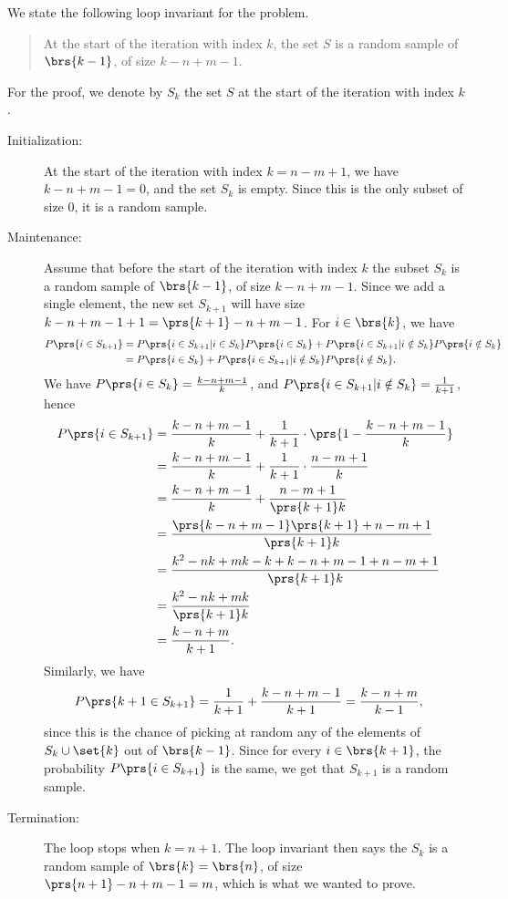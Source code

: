 \documentclass[oneside]{scrbook}
\theoremstyle{definition}
\begin{document}
\begin{exercise}
We state the following loop invariant for the problem.

\begin{quote}
At the start of the iteration with index $k$, the set $S$ is a random sample of $\brs{k-1}$, of size $k - n + m -1$.
\end{quote}

For the proof, we denote by $S_k$ the set $S$ at the start of the iteration with index $k$.

\begin{description}
\item[Initialization:]
At the start of the iteration with index $k = n -m + 1$, we have $k - n + m - 1 = 0$, and the set $S_k$ is empty. Since this is the only subset of size $0$, it is a random sample.
\item[Maintenance:]
Assume that before the start of the iteration with index $k$ the subset $S_k$ is a random sample of $\brs{k-1}$, of size $k - n + m - 1$. Since we add a single element, the new set $S_{k+1}$ will have size $k - n + m - 1 + 1 = \prs{k+1} - n + m -1$. For $i \in \brs{k}$, we have
\begin{align*}
P\prs{i \in S_{k+1}} &= P\prs{i \in S_{k+1} | i \in S_k} P\prs{i \in S_k} + P\prs{i \in S_{k+1} | i \notin S_k} P\prs{i \notin S_k}
\\&= P \prs{i \in S_k} + P\prs{i \in S_{k+1} | i \notin S_k} P\prs{i \notin S_k} \text{.}
\end{align*}
We have $P\prs{i \in S_k} = \frac{k-n+m-1}{k}$, and $P\prs{i \in S_{k+1} | i \notin S_k} = \frac{1}{k+1}$, hence
\begin{align*}
P\prs{i \in S_{k+1}} &= \frac{k-n+m-1}{k} + \frac{1}{k+1} \cdot \prs{1- \frac{k-n+m-1}{k}}
\\&= \frac{k-n+m-1}{k} + \frac{1}{k+1} \cdot \frac{n - m + 1}{k}
\\&= \frac{k-n+m-1}{k} +  \frac{n-m+1}{\prs{k+1}k}
\\&= \frac{\prs{k-n+m-1}\prs{k+1} + n - m + 1}{\prs{k+1}k}
\\&= \frac{k^2 - nk + mk - k + k - n + m - 1 + n - m + 1}{\prs{k+1}k}
\\&= \frac{k^2 - nk + mk}{\prs{k+1}k}
\\&= \frac{k - n + m}{k+1} \text{.}
\end{align*}
Similarly, we have
\begin{align*}
P\prs{k+1 \in S_{k+1}} &= \frac{1}{k+1} + \frac{k-n+m-1}{k+1} = \frac{k - n + m}{k-1} \text{,}
\end{align*}
since this is the chance of picking at random any of the elements of $S_k \cup \set{k}$ out of $\brs{k-1}$.
Since for every $i \in \brs{k+1}$, the probability $P\prs{i \in S_{k+1}}$ is the same, we get that $S_{k+1}$ is a random sample.
\item[Termination:]
The loop stops when $k = n+1$. The loop invariant then says the $S_k$ is a random sample of $\brs{k} = \brs{n}$, of size $\prs{n+1} - n + m - 1 = m$, which is what we wanted to prove.
\end{description}
\end{exercise}
\end{document}

